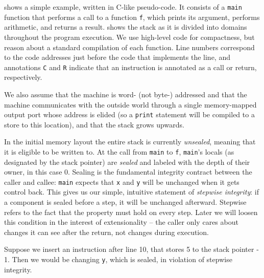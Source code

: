  shows a simple example, written in C-like pseudo-code.
It consists of a {\tt main} function that performs a call to a function {\tt f},
which prints its argument, performs arithmetic, and returns a result.
 shows the stack as it is divided into domains throughout
the program execution. We use high-level code for compactness, but reason about
a standard compilation of each function. Line numbers correspond to the code
addresses just before the code that implements the line, and annotations
{\tt C} and {\tt R} indicate that an instruction is annotated as a call or
return, respectively.

We also assume that the machine is word- (not byte-) addressed and that the
machine communicates with the outside world through a single memory-mapped
output port whose address is elided (so a {\tt print} statement will be
compiled to a store to this location), and that the stack grows upwards.

In the initial memory layout the entire stack is currently {\em unsealed},
meaning that it is eligible to be written to. At the call from {\tt main} to
{\tt f}, {\tt main}'s locals (as designated by the stack pointer) are
{\em sealed} and labeled with the depth of their owner, in this case 0.
Sealing is the fundamental integrity contract between the caller and callee:
{\tt main} expects that {\tt x} and {\tt y} will be unchanged when it gets control back.
This gives us our simple, intuitive statement of {\em stepwise integrity}:
if a component is sealed before a step, it will be unchanged afterward. Stepwise
refers to the fact that the property must hold on every step. Later we will
loosen this condition in the interest of extensionality -- the caller only
cares about changes it can see after the return, not changes during execution.

Suppose we insert an instruction after line 10, that stores 5 to the stack pointer - 1.
Then we would be changing {\tt y}, which is sealed, in violation of stepwise integrity.

